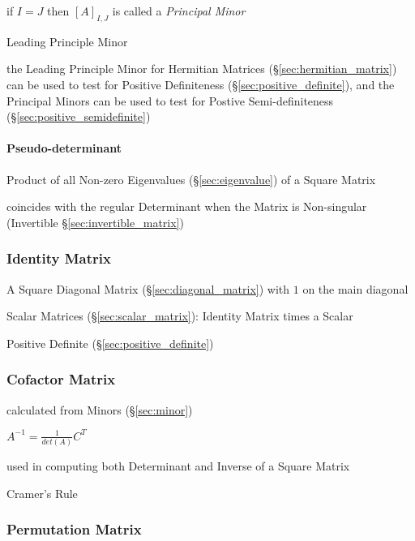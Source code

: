 if $I = J$ then $[A]_{I,J}$ is called a \emph{Principal Minor}

Leading Principle Minor

the Leading Principle Minor for Hermitian Matrices
(\S\ref{sec:hermitian_matrix}) can be used to test for Positive Definiteness
(\S\ref{sec:positive_definite}), and the Principal Minors can be used to test
for Postive Semi-definiteness (\S\ref{sec:positive_semidefinite})



\paragraph{Pseudo-determinant}\label{sec:pseudo_determinant}\hfill

Product of all Non-zero Eigenvalues (\S\ref{sec:eigenvalue}) of a Square Matrix

coincides with the regular Determinant when the Matrix is Non-singular
(Invertible \S\ref{sec:invertible_matrix})



\subsubsection{Identity Matrix}\label{sec:identity_matrix}

A Square Diagonal Matrix (\S\ref{sec:diagonal_matrix}) with $1$ on the main
diagonal

Scalar Matrices (\S\ref{sec:scalar_matrix}): Identity Matrix times a Scalar

Positive Definite (\S\ref{sec:positive_definite})



\subsubsection{Cofactor Matrix}\label{sec:cofactor_matrix}\hfill

calculated from Minors (\S\ref{sec:minor})

$A^{-1} = \frac{1}{det(A)}C^T$

used in computing both Determinant and Inverse of a Square Matrix

Cramer's Rule



\subsubsection{Permutation Matrix}\label{sec:permutation_matrix}

